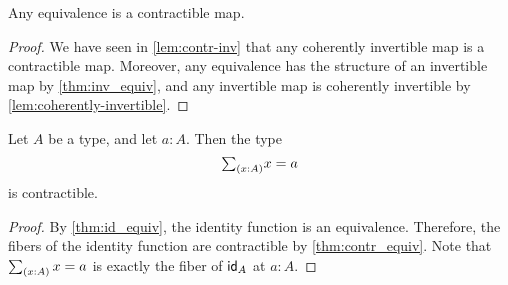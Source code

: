 \begin{thm}\label{thm:contr_equiv}
Any equivalence is a contractible map.
\end{thm}

\begin{proof}
  We have seen in \cref{lem:contr-inv} that any coherently invertible map is a contractible map. Moreover, any equivalence has the structure of an invertible map by \cref{thm:inv_equiv}, and any invertible map is coherently invertible by \cref{lem:coherently-invertible}.
\end{proof}

\begin{cor}\label{cor:contr_path}
Let $A$ be a type, and let $a:A$. Then the type
\begin{equation*}
\sm{x:A}x=a
\end{equation*}
is contractible.
\end{cor}

\begin{proof}
By \cref{thm:id_equiv}, the identity function is an equivalence. Therefore, the fibers of the identity function are contractible by \cref{thm:contr_equiv}. Note that $\sm{x:A}x=a$ is exactly the fiber of $\idfunc[A]$ at $a:A$.
\end{proof}

\begin{comment}
\begin{proof}
We have the term $(a,\refl{a}):\sm{x:A}a=x$, which we take for the center of contraction. To construct the contraction, we have to show that
\begin{equation*}
\prd{p:\sm{x:A}a=x} (a,\refl{a})=p.
\end{equation*}
By the induction principle for dependent pair types it suffices to construct a term of type
\begin{equation*}
\prd{x:A}{p:a=x} (a,\refl{a})=(x,p)
\end{equation*}
Note that we may proceed here by path induction on $p$. That is, it suffices to consider the case $p\jdeq\refl{a}$, and show that $(a,\refl{a})=(a,\refl{a})$. Here we choose $\refl{(a,\refl{a})}$.
\end{proof}
\end{comment}


